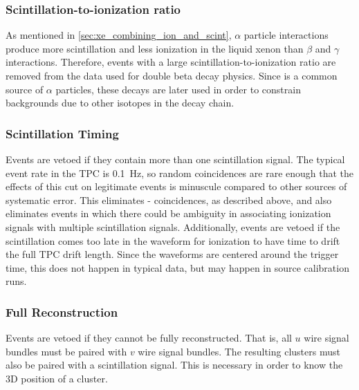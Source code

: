 \documentclass[herrin-thesis.tex]{subfiles}
\begin{document}
\subsubsection{Scintillation-to-ionization ratio}
As mentioned in \cref{sec:xe_combining_ion_and_scint}, \(\alpha\) particle interactions produce more scintillation and less ionization in the liquid xenon than \(\beta\) and \(\gamma\) interactions. Therefore, events with a large scintillation-to-ionization ratio are removed from the data used for double beta decay physics. Since  is a common source of \(\alpha\) particles, these decays are later used in order to constrain backgrounds due to other isotopes in the  decay chain.

\subsubsection{Scintillation Timing}
Events are vetoed if they contain more than one scintillation signal. The typical event rate in the TPC is \about{}\SI{0.1}{\Hz}, so random coincidences are rare enough that the effects of this cut on legitimate events is minuscule compared to other sources of systematic error. This eliminates - coincidences, as described above, and also eliminates events in which there could be ambiguity in associating ionization signals with multiple scintillation signals. Additionally, events are vetoed if the scintillation comes too late in the waveform for ionization to have time to drift the full TPC drift length. Since the waveforms are centered around the trigger time, this does not happen in typical data, but may happen in source calibration runs.

\subsubsection{Full Reconstruction}
Events are vetoed if they cannot be fully reconstructed. That is, all \(u\) wire signal bundles must be paired with \(v\) wire signal bundles. The resulting clusters must also be paired with a scintillation signal. This is necessary in order to know the 3D position of a cluster.
\end{document}
